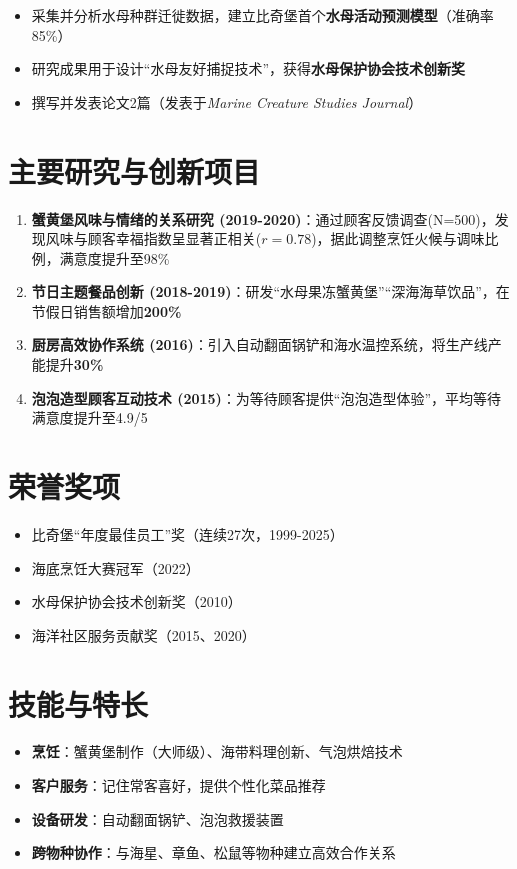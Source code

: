 \begin{itemize}
  \item 采集并分析水母种群迁徙数据，建立比奇堡首个\textbf{水母活动预测模型}（准确率85\%）
  \item 研究成果用于设计“水母友好捕捉技术”，获得\textbf{水母保护协会技术创新奖}
  \item 撰写并发表论文2篇（发表于\textit{Marine Creature Studies Journal}）
\end{itemize}

\section{主要研究与创新项目}

\begin{enumerate}
  \item \textbf{蟹黄堡风味与情绪的关系研究 (2019-2020)}：通过顾客反馈调查(N=500)，发现风味与顾客幸福指数呈显著正相关($r=0.78$)，据此调整烹饪火候与调味比例，满意度提升至98\%
  \item \textbf{节日主题餐品创新 (2018-2019)}：研发“水母果冻蟹黄堡”“深海海草饮品”，在节假日销售额增加\textbf{200\%}
  \item \textbf{厨房高效协作系统 (2016)}：引入自动翻面锅铲和海水温控系统，将生产线产能提升\textbf{30\%}
  \item \textbf{泡泡造型顾客互动技术 (2015)}：为等待顾客提供“泡泡造型体验”，平均等待满意度提升至4.9/5
\end{enumerate}

\section{荣誉奖项}
\begin{itemize}
  \item 比奇堡“年度最佳员工”奖（连续27次，1999-2025）
  \item 海底烹饪大赛冠军（2022）
  \item 水母保护协会技术创新奖（2010）
  \item 海洋社区服务贡献奖（2015、2020）
\end{itemize}

\section{技能与特长}
\begin{itemize}
  \item \textbf{烹饪}：蟹黄堡制作（大师级）、海带料理创新、气泡烘焙技术
  \item \textbf{客户服务}：记住常客喜好，提供个性化菜品推荐
  \item \textbf{设备研发}：自动翻面锅铲、泡泡救援装置
  \item \textbf{跨物种协作}：与海星、章鱼、松鼠等物种建立高效合作关系
\end{itemize}


